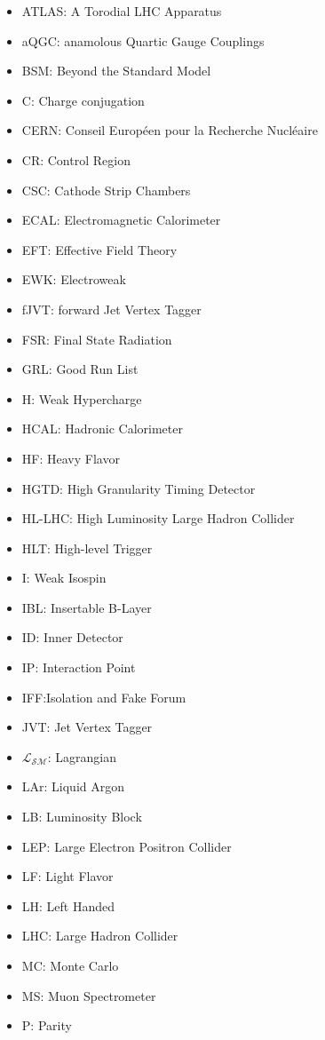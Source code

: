 \begin{itemize}
\item{ATLAS: A Torodial LHC Apparatus}
\item{aQGC: anamolous Quartic Gauge Couplings} 
\item{BSM: Beyond the Standard Model}
\item{C: Charge conjugation}
\item{CERN: Conseil Europ\'{e}en pour la Recherche Nucl\'{e}aire}
\item{CR: Control Region}
\item{CSC: Cathode Strip Chambers } 
\item{ECAL: Electromagnetic Calorimeter} 
\item{EFT: Effective Field Theory}
\item{EWK: Electroweak}
\item{fJVT: forward Jet Vertex Tagger} 
\item{FSR: Final State Radiation}
\item{GRL: Good Run List}
\item{H: Weak Hypercharge}
\item{HCAL: Hadronic Calorimeter}
\item{HF: Heavy Flavor}
\item{HGTD: High Granularity Timing Detector} 
\item{HL-LHC: High Luminosity Large Hadron Collider}  
\item{HLT: High-level Trigger} 
\item{I: Weak Isospin}
\item{IBL: Insertable B-Layer} 
\item{ID: Inner Detector} 
\item{IP: Interaction Point}
\item{IFF:Isolation and Fake Forum}
\item{JVT: Jet Vertex Tagger} 
\item{$\mathcal{L_{SM}}$: Lagrangian}
\item{LAr: Liquid Argon} 
\item{LB: Luminosity Block}
\item{LEP: Large Electron Positron Collider} 
\item{LF: Light Flavor} 
\item{LH:  Left Handed}
\item{LHC: Large Hadron Collider}
\item{MC: Monte Carlo}
\item{MS: Muon Spectrometer}
\item{P: Parity}

\end{itemize}
